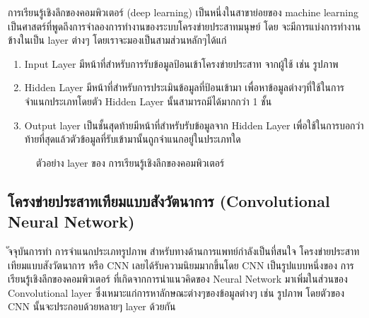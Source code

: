 \documentclass[12pt,oneside,openright,a4paper]{cpe-thai-project}
\begin{document}
\par การเรียนรู้เชิงลึกของคอมพิวเตอร์ (deep learning) เป็นหนึ่งในสาขาย่อยของ machine learning เป็นศาสตร์ที่พูดถึงการจำลองการทำงานของระบบโครงข่ายประสาทมนุษย์ โดย จะมีการแบ่งการทำงานข้างในเป็น layer ต่างๆ โดยเราจะมองเป็นสามส่วนหลักๆได้แก่ 	

\begin{enumerate}
  \item Input Layer มีหน้าที่สำหรับการรับข้อมูลป้อนเข้าโครงข่ายประสาท จากผู้ใช้ เช่น รูปภาพ
  \item Hidden Layer มีหน้าที่สำหรับการประเมินข้อมูลที่ป้อนเข้ามา เพื่อหาข้อมูลต่างๆที่ใช้ในการจำแนกประเภทโดยตัว Hidden Layer นั้นสามารถมีได้มากกว่า 1 ชั้น
  \item Output layer เป็นชั้นสุดท้ายมีหน้าที่สำหรับรับข้อมูลจาก Hidden Layer เพื่อใช้ในการบอกว่าท้ายที่สุดแล้วตัวข้อมูลที่รับเข้ามานั้นถูกจำแนกอยู่ในประเภทใด
\end{enumerate}

\begin{figure}[!ht]\centering
  \setlength{\fboxrule}{0.2mm} %
  \setlength{\fboxsep}{1cm}
  \caption{ตัวอย่าง layer ของ การเรียนรู้เชิงลึกของคอมพิวเตอร์}\label{fig:deep}
\end{figure}
\newpage
\subsection{โครงข่ายประสาทเทียมแบบสังวัตนาการ (Convolutional Neural Network)\cite{CS231}} 
ัจจุบันการทำ การจำแนกประเภทรูปภาพ สำหรับทางด้านการแพทย์กำลังเป็นที่สนใจ โครงข่ายประสาทเทียมแบบสังวัตนาการ 
หรือ CNN เลยได้รับความนิยมมากขึ้นโดย CNN เป็นรูปแบบหนึ่งของ การเรียนรู้เชิงลึกของคอมพิวเตอร์ ที่เกิดจากการนำแนวคิดของ  
Neural Network มาเพิ่มในส่วนของ Convolutional layer ซึ่งเหมาะแก่การหาลักษณะต่างๆของข้อมูลต่างๆ เช่น รูปภาพ 
โดยตัวของ CNN นั้นจะประกอบด้วยหลายๆ layer ด้วยกัน
\end{document}
